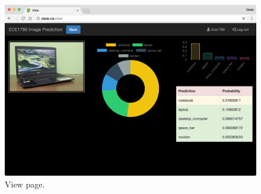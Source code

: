 \documentclass[conference]{IEEEtran}
\begin{document}
\begin{figure}
  \centering
  \includegraphics[width=\linewidth]{pc_view.png}
  \caption{View page.}
  \label{fig:pc_view}
\end{figure}

%
%

\end{document}
